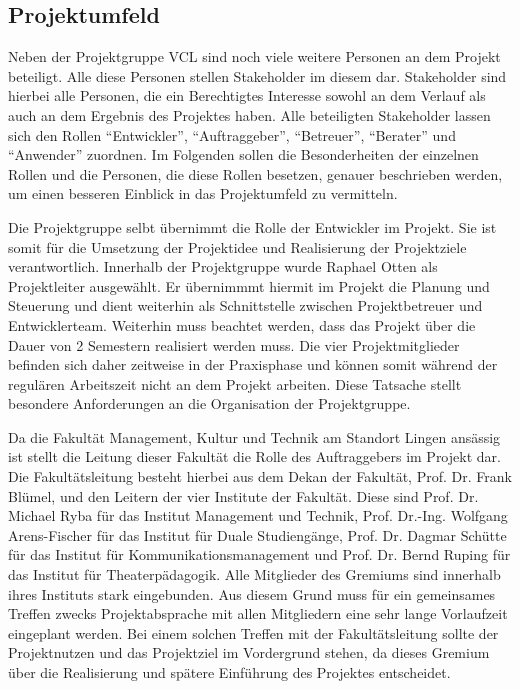 \clearpage

\subsection{Projektumfeld}
\label{sec:Projektumfeld}

Neben der Projektgruppe \acs{VCL} sind noch viele weitere Personen an dem
Projekt beteiligt. Alle diese Personen stellen Stakeholder im diesem dar.
Stakeholder sind hierbei alle Personen, die ein Berechtigtes Interesse sowohl
an dem Verlauf als auch an dem Ergebnis des Projektes haben. Alle
beteiligten Stakeholder lassen sich den Rollen "`Entwickler"', "`Auftraggeber"',
"`Betreuer"', "`Berater"' und "`Anwender"' zuordnen. Im Folgenden sollen die
Besonderheiten der einzelnen Rollen und die Personen, die diese Rollen besetzen,
genauer beschrieben werden, um einen besseren Einblick in das Projektumfeld zu
vermitteln.

Die Projektgruppe selbt übernimmt die Rolle der Entwickler im Projekt. Sie ist
somit für die Umsetzung der Projektidee und Realisierung der Projektziele
verantwortlich. Innerhalb der Projektgruppe wurde Raphael Otten als
Projektleiter ausgewählt. Er übernimmmt hiermit im Projekt die Planung und
Steuerung und dient weiterhin als Schnittstelle zwischen Projektbetreuer und
Entwicklerteam. Weiterhin muss beachtet werden, dass das Projekt über die Dauer
von 2 Semestern realisiert werden muss. Die vier Projektmitglieder befinden sich
daher zeitweise in der Praxisphase und können somit während der regulären
Arbeitszeit nicht an dem Projekt arbeiten. Diese Tatsache stellt besondere
Anforderungen an die Organisation der Projektgruppe.

Da die Fakultät Management, Kultur und Technik am Standort Lingen ansässig ist
stellt die Leitung dieser Fakultät die Rolle des Auftraggebers im Projekt dar.
Die Fakultätsleitung besteht hierbei aus dem Dekan der Fakultät, Prof. Dr. Frank
Blümel, und den Leitern der vier Institute der Fakultät. Diese sind Prof. Dr.
Michael Ryba für das Institut Management und Technik, Prof. Dr.-Ing. Wolfgang
Arens-Fischer für das Institut für Duale Studiengänge, Prof. Dr. Dagmar Schütte
für das Institut für Kommunikationsmanagement und Prof. Dr. Bernd Ruping für das
Institut für Theaterpädagogik. Alle Mitglieder des Gremiums sind innerhalb ihres
Instituts stark eingebunden. Aus diesem Grund muss für ein gemeinsames Treffen
zwecks Projektabsprache mit allen Mitgliedern eine sehr lange Vorlaufzeit
eingeplant werden. Bei einem solchen Treffen mit der Fakultätsleitung sollte
der Projektnutzen und das Projektziel im Vordergrund stehen, da dieses Gremium
über die Realisierung und spätere Einführung des Projektes entscheidet.

